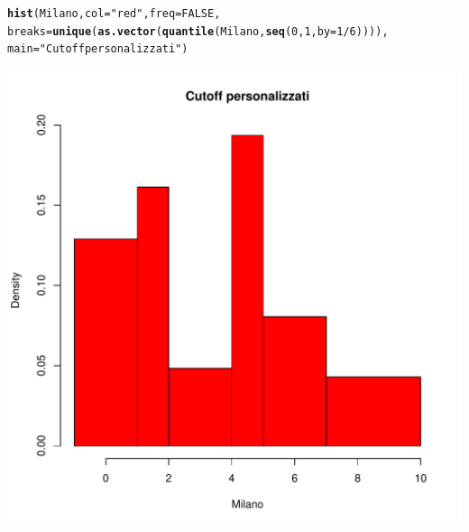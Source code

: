 \documentclass[onecolumn,12pt]{book}\usepackage[]{graphicx}\usepackage[]{color}
\makeatletter
\def\maxwidth{ %
  \ifdim\Gin@nat@width>\linewidth
    \linewidth
  \else
    \Gin@nat@width
  \fi
}
\newcommand{\hlnum}[1]{\textcolor[rgb]{0.686,0.059,0.569}{#1}}%
\newcommand{\hlstr}[1]{\textcolor[rgb]{0.192,0.494,0.8}{#1}}%
\newcommand{\hlopt}[1]{\textcolor[rgb]{0,0,0}{#1}}%
\newcommand{\hlstd}[1]{\textcolor[rgb]{0.345,0.345,0.345}{#1}}%
\newcommand{\hlkwc}[1]{\textcolor[rgb]{0.333,0.667,0.333}{#1}}%
\newcommand{\hlkwd}[1]{\textcolor[rgb]{0.737,0.353,0.396}{\textbf{#1}}}%
\newenvironment{kframe}{%
 \def\at@end@of@kframe{}%
 \ifinner\ifhmode%
  \def\at@end@of@kframe{\end{minipage}}%
  \begin{minipage}{\columnwidth}%
 \fi\fi%
 \def\FrameCommand##1{\hskip\@totalleftmargin \hskip-\fboxsep
 \colorbox{shadecolor}{##1}\hskip-\fboxsep
     \hskip-\linewidth \hskip-\@totalleftmargin \hskip\columnwidth}%
 \MakeFramed {\advance\hsize-\width
   \@totalleftmargin\z@ \linewidth\hsize
   \@setminipage}}%
 {\par\unskip\endMakeFramed%
 \at@end@of@kframe}
\newenvironment{knitrout}{}{} %
\makeatother
\begin{document}
\begin{knitrout}
\color{fgcolor}\begin{kframe}
\begin{alltt}
\hlkwd{hist}\hlstd{(Milano,}\hlkwc{col}\hlstd{=}\hlstr{"red"}\hlstd{,}\hlkwc{freq}\hlstd{=}\hlnum{FALSE}\hlstd{,}
\hlkwc{breaks}\hlstd{=}\hlkwd{unique}\hlstd{(}\hlkwd{as.vector}\hlstd{(}\hlkwd{quantile}\hlstd{(Milano,}\hlkwd{seq}\hlstd{(}\hlnum{0}\hlstd{,}\hlnum{1}\hlstd{,}\hlkwc{by}\hlstd{=}\hlnum{1}\hlopt{/}\hlnum{6}\hlstd{)))),}
\hlkwc{main}\hlstd{=}\hlstr{"Cutoff personalizzati"}\hlstd{)}
\end{alltt}
\end{kframe}
\includegraphics[width=\maxwidth]{figure/unnamed-chunk-108-1} 

\end{knitrout}
\end{document}
